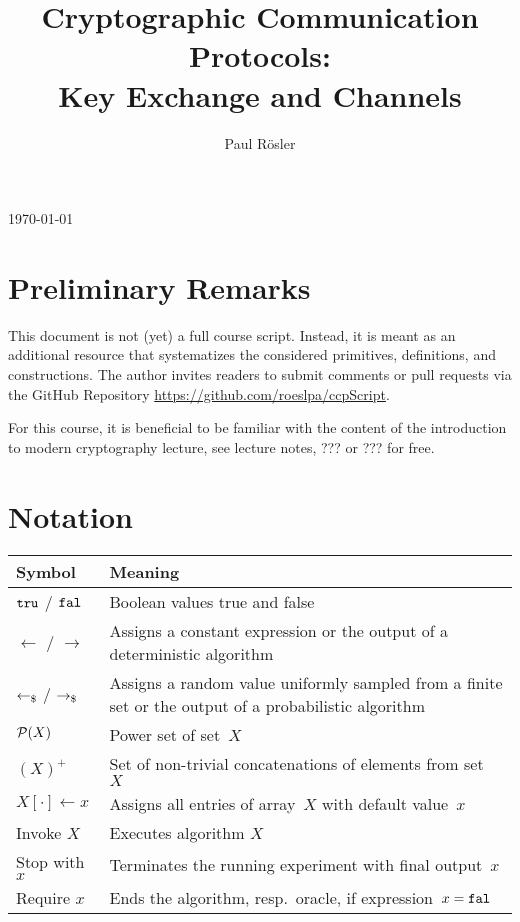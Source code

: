 \documentclass[a4paper,orivec]{llncs}
\title{Cryptographic Communication Protocols:\\Key Exchange and Channels}
\author{Paul Rösler}
\institute{FAU Erlangen-Nürnberg}
\begin{document}
\maketitle
\begin{center}
    \today
\end{center}

\begingroup
\let\clearpage\relax
\tableofcontents
\endgroup

\section{Preliminary Remarks}
This document is not (yet) a full course script.
Instead, it is meant as an additional resource that systematizes the considered primitives, definitions, and constructions.
The author invites readers to submit comments or pull requests via the GitHub Repository \url{https://github.com/roeslpa/ccpScript}.

For this course, it is beneficial to be familiar with the content of the introduction to modern cryptography lecture, see lecture notes, ??? or ??? for free.

\section{Notation}

\begin{tabular}{|l|p{13cm}|}\hline
    \textbf{Symbol} & \textbf{Meaning}\\\hline
    $\mathtt{tru}$ / $\mathtt{fal}$ & Boolean values true and false\\
    $\gets$ / $\to$ & Assigns a constant expression or the output of a deterministic algorithm\\
    $\getsr$ / $\tor$ & Assigns a random value uniformly sampled from a finite set or the output of a probabilistic algorithm\\
    $\mathcal{P}(X)$ & Power set of set~$X$\\
    $(X)^+$ & Set of non-trivial concatenations of elements from set~$X$\\
    $X[\cdot]\gets x$ & Assigns all entries of array~$X$ with default value~$x$\\
    Invoke $X$ & Executes algorithm $X$\\
    Stop with $x$ & Terminates the running experiment with final output~$x$\\
    Require $x$ & Ends the algorithm, resp.~oracle, if expression~$x=\mathtt{fal}$\\\hline
\end{tabular}
\end{document}
